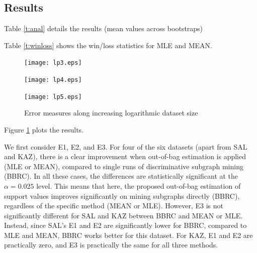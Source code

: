 \documentclass{sig-alternate}
\begin{document}
\subsection{Results}
\label{ss:Results}

Table \ref{t:anal} details the results (mean values across bootstraps)

%
Table \ref{t:winloss} shows the win/loss statistics for MLE and MEAN.

\begin{figure}[t]
  \begin{minipage}[h]{5.5cm}
    \texttt{[image: lp3.eps]}
  \end{minipage}
  \begin{minipage}[h]{5.5cm}
    \texttt{[image: lp4.eps]}
  \end{minipage}
  \begin{minipage}[h]{5.5cm}
    \texttt{[image: lp5.eps]}
  \end{minipage}
  \caption{Error measures along increasing logarithmic dataset size}
  \label{fig:lp}
\end{figure}
%
Figure \ref{fig:lp} plots the results. 

We first consider E1, E2, and E3. 
For four of the six datasets (apart from SAL and KAZ), there is a clear improvement when out-of-bag estimation is applied (MLE or MEAN), compared to single runs of discriminative subgraph mining (BBRC).
In all these cases, the differences are statistically significant at the $\alpha=0.025$ level. 
This means that here, the proposed out-of-bag estimation of support values improves significantly on mining subgraphs directly (BBRC), regardless of the specific method (MEAN or MLE). 
However, E3 is not significantly different for SAL and KAZ between BBRC and MEAN or MLE. Instead, since SAL's E1 and E2 are significantly lower for BBRC, compared to MLE and MEAN, BBRC works better for this dataset.
For KAZ, E1 and E2 are practically zero, and E3 is practically the same for all three methods.
\end{document}
